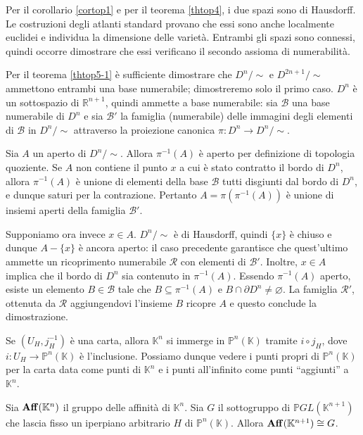 \Proof Per il corollario \ref{cortop1} e per il teorema \ref{thtop4}, i due spazi sono di Hausdorff. Le costruzioni degli atlanti standard provano che essi sono anche localmente euclidei e individua la dimensione delle variet\`a. Entrambi gli spazi sono connessi, quindi occorre dimostrare che essi verificano il secondo assioma di numerabilit\`a.
\par Per il teorema \ref{thtop5-1} \`e sufficiente dimostrare che $D^n/\sim$ e $D^{2n + 1}/\sim$ ammettono entrambi una base numerabile; dimostreremo solo il primo caso. $D^n$ \`e un sottospazio di $\mathbb{R}^{n + 1}$, quindi ammette a base numerabile: sia $\mathcal{B}$ una base numerabile di $D^n$ e sia $\mathcal{B}'$ la famiglia (numerabile) delle immagini degli elementi di $\mathcal{B}$ in $D^n/\sim$ attraverso la proiezione canonica $\pi: D^n \rightarrow D^n/\sim$.
\par Sia $A$ un aperto di $D^n/\sim$. Allora $\pi^{-1}(A)$ \`e aperto per definizione di topologia quoziente. Se $A$ non contiene il punto $x$ a cui \`e stato contratto il bordo di $D^n$, allora $\pi^{-1}(A)$ \`e unione di elementi della base $\mathcal{B}$ tutti disgiunti dal bordo di $D^n$, e dunque saturi per la contrazione. Pertanto $A = \pi(\pi^{-1}(A))$ \`e unione di insiemi aperti della famiglia $\mathcal{B}'$.
\par Supponiamo ora invece $x \in A$. $D^n/\sim$ \`e di Hausdorff, quindi $\lbrace x \rbrace$ \`e chiuso e dunque $A - \lbrace x \rbrace$ \`e ancora aperto: il caso precedente garantisce che quest'ultimo ammette un ricoprimento numerabile $\mathcal{R}$ con elementi di $\mathcal{B}'$. Inoltre, $x \in A$ implica che il bordo di $D^n$ sia contenuto in $\pi^{-1}(A)$. Essendo $\pi^{-1}(A)$ aperto, esiste un elemento $B \in \mathcal{B}$ tale che $B \subseteq \pi^{-1}(A)$ e $B \cap \partial D^n \neq \varnothing$. La famiglia $\mathcal{R}'$, ottenuta da $\mathcal{R}$ aggiungendovi l'insieme $B$ ricopre $A$ e questo conclude la dimostrazione.
	\par Se $(U_H, j_H^{-1})$ \`e una carta, allora $\mathbb{K}^n$ si immerge in $\mathbb{P}^n(\mathbb{K})$ tramite $i \circ j_H$, dove $i: U_H \rightarrow \mathbb{P}^n(\mathbb{K})$ \`e l'inclusione. Possiamo dunque vedere i punti propri di $\mathbb{P}^n(\mathbb{K})$ per la carta data come punti di $\mathbb{K}^n$ e i punti all'infinito come punti ``aggiunti'' a $\mathbb{K}^n$.
\begin{Theorem}\label{thtop6}
	Sia $\mathbf{Aff}(\mathbb{K}^n)$ il gruppo delle affinit\`a di $\mathbb{K}^n$. Sia $G$ il sottogruppo di $\mathbb{P}GL(\mathbb{K}^{n + 1})$ che lascia fisso un iperpiano arbitrario $H$ di $\mathbb{P}^n(\mathbb{K})$. Allora $\mathbf{Aff}(\mathbb{K}^{n + 1}) \cong G$.
\end{Theorem}
